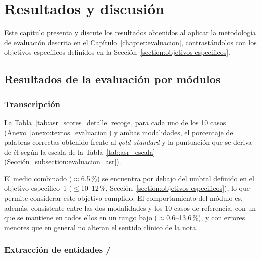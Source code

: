\chapter{Resultados y discusión}\label{chapter:resultados}

Este capítulo presenta y discute los resultados obtenidos al aplicar la metodología de evaluación
descrita en el Capítulo~\ref{chapter:evaluacion}, contrastándolos con los objetivos específicos
definidos en la Sección~\ref{section:objetivos-especificos}.

\section{Resultados de la evaluación por módulos}\label{section:resultados_modulos}

\subsection{Transcripción }\label{subsection:resultados_asr}

La Tabla~\ref{tab:asr_scores_detalle} recoge, para cada uno de los 10 casos (Anexo~\ref{anexo:textos_evaluacion}) y ambas modalidades, el
porcentaje de palabras correctas obtenido frente al \textit{gold standard} y la puntuación que se
deriva de él según la escala de la Tabla~\ref{tab:asr_escala} (Sección~\ref{subsection:evaluacion_asr}).





El  medio combinado ($\approx$6.5\,\%) se encuentra por debajo del umbral definido
en el objetivo específico~1 ($\le$10--12\,\%, Sección~\ref{section:objetivos-especificos}), lo que
permite considerar este objetivo cumplido. El comportamiento del módulo es, además, consistente
entre las dos modalidades y los 10 casos de referencia, con un  que se mantiene en
todos ellos en un rango bajo ($\approx$0.6--13.6\,\%), y con errores menores que en general no
alteran el sentido clínico de la nota.

\subsection{Extracción de entidades /}\label{subsection:resultados_pln}

